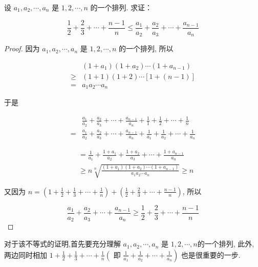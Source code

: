 \begin{example}
	设 $a_{1}, a_{2}, \cdots, a_{n}$ 是 $1,2, \cdots, n$ 的一个排列. 求证：
	
	$$
	\frac{1}{2}+\frac{2}{3}+\cdots+\frac{n-1}{n} \leqslant \frac{a_{1}}{a_{2}}+\frac{a_{2}}{a_{3}}+\cdots+\frac{a_{n-1}}{a_{n}}
	$$
\end{example}
\begin{proof}
	因为 $a_{1}, a_{2}, \cdots, a_{n}$ 是 $1,2, \cdots, n$ 的一个排列, 所以
	
	$$
	\begin{aligned}
	& \left(1+a_{1}\right)\left(1+a_{2}\right) \cdots\left(1+a_{n-1}\right) \\
	\geqslant & (1+1)(1+2) \cdots[1+(n-1)] \\
	= & a_{1} a_{2} \cdots a_{n}
	\end{aligned}
	$$
	
	于是
	
	$$
	\begin{aligned}
	& \frac{a_{1}}{a_{2}}+\frac{a_{2}}{a_{3}}+\cdots+\frac{a_{n-1}}{a_{n}}+\frac{1}{1}+\frac{1}{2}+\cdots+\frac{1}{n} \\
	= & \frac{a_{1}}{a_{2}}+\frac{a_{2}}{a_{3}}+\cdots+\frac{a_{n-1}}{a_{n}}+\frac{1}{a_{1}}+\frac{1}{a_{2}}+\cdots+\frac{1}{a_{n}}
	\end{aligned}
	$$
	
	$$
	\begin{aligned}
	& =\frac{1}{a_{1}}+\frac{1+a_{1}}{a_{2}}+\frac{1+a_{2}}{a_{3}}+\cdots+\frac{1+a_{n-1}}{a_{n}} \\
	& \geqslant n \sqrt[n]{\frac{\left(1+a_{1}\right)\left(1+a_{2}\right) \cdots\left(1+a_{n-1}\right)}{a_{1} a_{2} \cdots a_{n}}} \geqslant n
	\end{aligned}
	$$
	
	又因为 $n=\left(1+\frac{1}{2}+\frac{1}{3}+\cdots+\frac{1}{n}\right)+\left(\frac{1}{2}+\frac{2}{3}+\cdots+\frac{n-1}{n}\right)$, 所以
	
	$$
	\frac{a_{1}}{a_{2}}+\frac{a_{2}}{a_{3}}+\cdots+\frac{a_{n-1}}{a_{n}} \geqslant \frac{1}{2}+\frac{2}{3}+\cdots+\frac{n-1}{n}
	$$
\end{proof}
\begin{note}
	对于该不等式的证明,首先要充分理解 $a_{1}, a_{2}, \cdots, a_{n}$ 是 $1,2, \cdots, n$的一个排列, 此外, 两边同时相加 $1+\frac{1}{2}+\frac{1}{3}+\cdots+\frac{1}{n}\left(\right.$ 即 $\left.\frac{1}{a_{1}}+\frac{1}{a_{2}}+\cdots+\frac{1}{a_{n}}\right)$ 也是很重要的一步.
\end{note}

